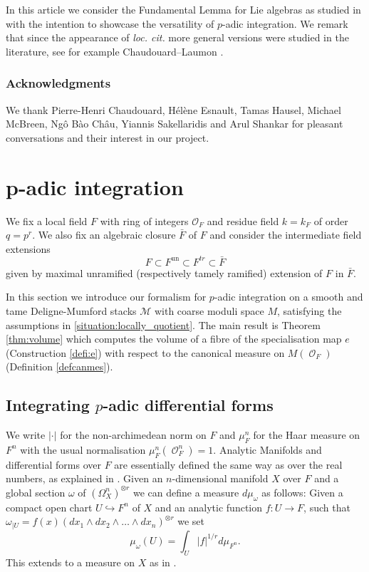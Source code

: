 \documentclass{article}
\newcommand{\Mc}{\mathcal{M}}
\DeclareMathOperator{\Oo}{\mathcal{O}}
\newcommand{\CO}{{\mathcal O}}
\theoremstyle{definition}
\theoremstyle{plain}
\begin{document}
In this article we consider the Fundamental Lemma for Lie algebras as studied in \cite{MR2653248} with the intention to showcase the versatility of $p$-adic integration. We remark that since the appearance of \emph{loc. cit.} more general versions were studied in the literature, see for example Chaudouard--Laumon \cite{MR2735371,Chaudouard:2009uq}.


\subsubsection*{Acknowledgments} We thank Pierre-Henri Chaudouard, H\'el\`ene Esnault, Tamas Hausel, Michael McBreen, Ng\^o B\`ao Ch\^au, Yiannis Sakellaridis and Arul Shankar for pleasant conversations and their interest in our project.



\section{p-adic integration}\label{padicint}
We fix a local field $F$ with ring of integers $\CO_F$ and residue field $k=k_F$ of order $q=p^r$. We also fix an algebraic closure $\bar F$ of $F$ and consider the intermediate field extensions
\begin{equation*}
  F \subset F^\text{un} \subset F^{tr} \subset \bar F
\end{equation*}
given by maximal unramified (respectively tamely ramified) extension of $F$ in $\bar F$.

In this section we introduce our formalism for $p$-adic integration on a smooth and tame Deligne-Mumford stacks $\Mc$ with coarse moduli space $M$, satisfying the assumptions in \ref{situation:locally_quotient}. The main result is Theorem \ref{thm:volume} which computes the volume of a fibre of the specialisation map $e$ (Construction \ref{defi:e}) with respect to the canonical measure on $M(\Oo_F)$ (Definition \ref{defcanmes}).



\subsection{Integrating $p$-adic differential forms}

 We write $|\cdot|$ for the non-archimedean norm on $F$ and $\mu_F^n$ for the Haar measure on $F^n$ with the usual normalisation $\mu_F^n(\Oo_F^n)=1$. Analytic Manifolds and differential forms over $F$ are essentially defined the same way as over the real numbers, as explained in \cite{MR1743467}. 
Given an $n$-dimensional manifold $X$ over $F$ and a global section $\omega$ of $(\Omega^n_X)^{\otimes r}$ we can define a measure $d\mu_\omega$ as follows: Given a compact open chart $U \hookrightarrow F^n$ of $X$ and an analytic function $f: U \rightarrow F$, such that $\omega_{|U} = f(x)(d x_1 \wedge d x_2 \wedge\dots \wedge d x_n)^{\otimes r}$ we set
\[ \mu_{\omega}(U)  = \int_U |f|^{1/r} d\mu_{F^n}.\]
This extends to a measure on $X$ as in \cite[3.2]{Yasuda:2014aa}.
\end{document}
